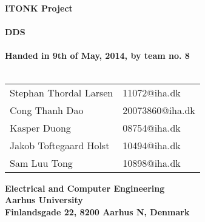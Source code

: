 \begin{titlepage}
\begin{center}
{\LARGE \textbf{ITONK Project}}\\~\\
{\LARGE \textbf{DDS}}\\~\\
\textbf{Handed in 9th of May, 2014, by team no. 8}\\~\\
\begin{tabular}{ll}
Stephan Thordal Larsen & 11072@iha.dk \\
Cong Thanh Dao & 20073860@iha.dk \\
Kasper Duong & 08754@iha.dk \\
Jakob Toftegaard Holst & 10494@iha.dk \\
Sam Luu Tong & 10898@iha.dk \\
\end{tabular}
\vfill
\textbf{Electrical and Computer Engineering}\\
\textbf{Aarhus University}\\
\textbf{Finlandsgade 22, 8200 Aarhus N, Denmark}
\end{center}
\end{titlepage} 